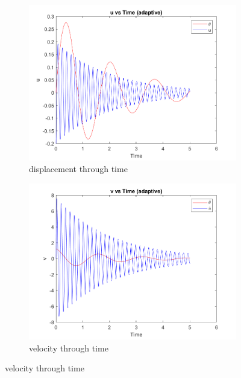 \documentclass[a4paper,12pt]{article}
\begin{document}
\begin{figure}[h]
  \centering
  \begin{subfigure}[b]{0.5\textwidth}
      \includegraphics[width=\textwidth]{../../Matlab/adaptive_plots/u_vs_time.png}
      \caption{displacement through time}
      \label{fig:image13}
  \end{subfigure}
  \hspace{-1.0em}%
  \begin{subfigure}[b]{0.5\textwidth}
      \includegraphics[width=\textwidth]{../../Matlab/adaptive_plots/v_vs_time.png}
      \caption{velocity through time}
      \label{fig:image14}
  \end{subfigure}


\end{figure}
\end{document}

